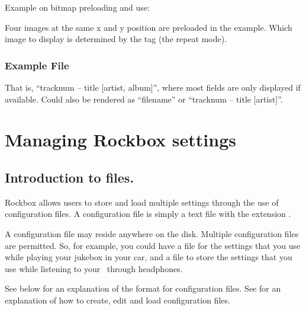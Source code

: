 Example on bitmap preloading and use:
\begin{example}
\end{example}
Four images at the same x and y position are preloaded in the example. Which 
image to display is determined by the  tag (the repeat mode).

\subsubsection{Example File}
\begin{example}
\end{example}
That is, ``tracknum -- title [artist, album]'', where most fields are only
displayed if available. Could also be rendered as ``filename'' or ``tracknum --
title [artist]''.

%  

\section{\label{ref:manage_settings}Managing Rockbox settings}

\subsection{Introduction to  files.}
Rockbox allows users to store and load multiple settings through the use of 
configuration files.  A configuration file is simply a text file with the 
extension .  

A configuration file may reside anywhere on the disk. Multiple
configuration files are permitted. So, for example, you could have
a  file for the settings that you use while playing your
jukebox in your car, and a  file to store the
settings that you use while listening to your \dap\ through headphones.

See  below for an explanation of the format 
for configuration files.  See  for an 
explanation of how to create, edit and load configuration files.

